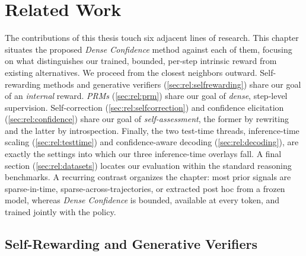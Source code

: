 \documentclass[a4paper,oneside,10pt,english]{scrbook}
\DeclareRobustCommand{\acfpit}[1]{\textit{\acp{#1}}}
\begin{document}
\cleardoubleoddpage
\chapter{Related Work}
\label{ch:related}

The contributions of this thesis touch six adjacent lines of research. This chapter situates the proposed \textit{Dense Confidence} method against each of them, focusing on what distinguishes our trained, bounded, per-step intrinsic reward from existing alternatives. We proceed from the closest neighbors outward. Self-rewarding methods and generative verifiers (\autoref{sec:rel:selfrewarding}) share our goal of an \emph{internal} reward. \acfpit{PRM} (\autoref{sec:rel:prm}) share our goal of \emph{dense}, step-level supervision. Self-correction (\autoref{sec:rel:selfcorrection}) and confidence elicitation (\autoref{sec:rel:confidence}) share our goal of \emph{self-assessment}, the former by rewriting and the latter by introspection. Finally, the two test-time threads, inference-time scaling (\autoref{sec:rel:testtime}) and confidence-aware decoding (\autoref{sec:rel:decoding}), are exactly the settings into which our three inference-time overlays fall. A final section (\autoref{sec:rel:datasets}) locates our evaluation within the standard reasoning benchmarks. A recurring contrast organizes the chapter: most prior signals are sparse-in-time, sparse-across-trajectories, or extracted post hoc from a frozen model, whereas \textit{Dense Confidence} is bounded, available at every token, and trained jointly with the policy.

\section{Self-Rewarding and Generative Verifiers}
\label{sec:rel:selfrewarding}
\end{document}
